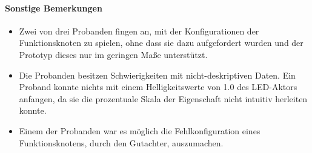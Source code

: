\paragraph{Sonstige Bemerkungen} 
\begin{itemize}
    \item Zwei von drei Probanden fingen an, mit der Konfigurationen der Funktionsknoten zu spielen, ohne dass sie dazu aufgefordert wurden und der Prototyp dieses nur im geringen Maße unterstützt.
    \item Die Probanden besitzen Schwierigkeiten mit nicht-deskriptiven Daten. Ein Proband konnte nichts mit einem Helligkeitswerte von 1.0 des LED-Aktors anfangen, da sie die prozentuale Skala der Eigenschaft nicht intuitiv herleiten konnte.
    \item Einem der Probanden war es möglich die Fehlkonfiguration eines Funktionsknotens, durch den Gutachter, auszumachen.
\end{itemize}
